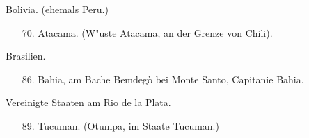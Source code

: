\documentclass[a4paper, 11pt, oneside, polutonikogreek, german]{article}
\begin{document}
\begin{center}
Bolivia. (ehemals Peru.)
\end{center}
\begin{itemize}
    
    \item[70.] Atacama. (W"uste Atacama, an der Grenze von Chili).
\end{itemize}
\begin{center}
Brasilien.
\end{center}
\begin{itemize}
    
    \item[86.] Bahia, am Bache Bemdegò bei Monte Santo, Capitanie Bahia.
\end{itemize}
\begin{center}
Vereinigte Staaten am Rio de la Plata.
\end{center}
\begin{itemize}
    
    \item[89.] Tucuman. (Otumpa, im Staate Tucuman.)
\end{itemize}
\clearpage
\end{document}
